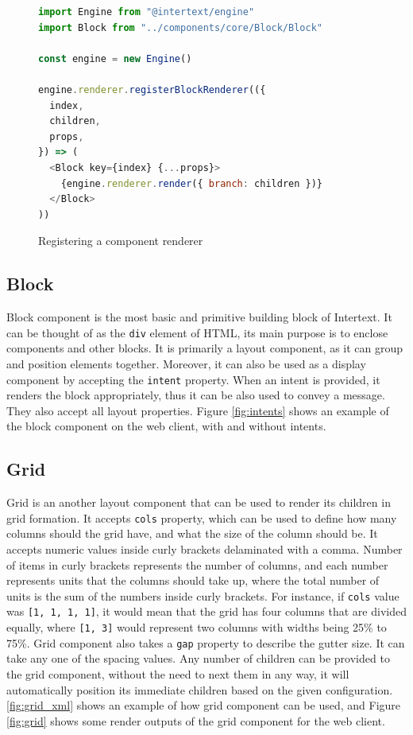 \begin{figure}
\begin{minipage}{\linewidth}
\begin{lstlisting}[language=javascript]
import Engine from "@intertext/engine"
import Block from "../components/core/Block/Block"

const engine = new Engine()

engine.renderer.registerBlockRenderer(({
  index,
  children,
  props,
}) => (
  <Block key={index} {...props}>
    {engine.renderer.render({ branch: children })}
  </Block>
))
\end{lstlisting}
\end{minipage}
\caption{Registering a component renderer}%
\label{fig:registering_renderer}%
\end{figure}

\subsection{Block}

Block component is the most basic and primitive building block of Intertext. It can be thought of as the \texttt{div} element of HTML, its main purpose is to enclose components and other blocks. It is primarily a layout component, as it can group and position elements together. Moreover, it can also be used as a display component by accepting the \texttt{intent} property. When an intent is provided, it renders the block appropriately, thus it can be also used to convey a message. They also accept all layout properties. Figure \ref{fig:intents} shows an example of the block component on the web client, with and without intents.

\subsection{Grid}

Grid is an another layout component that can be used to render its children in grid formation. It accepts \texttt{cols} property, which can be used to define how many columns should the grid have, and what the size of the column should be. It accepts numeric values inside curly brackets delaminated with a comma. Number of items in curly brackets represents the number of columns, and each number represents units that the columns should take up, where the total number of units is the sum of the numbers inside curly brackets. For instance, if \texttt{cols} value was \texttt{[1, 1, 1, 1]}, it would mean that the grid has four columns that are divided equally, where \texttt{[1, 3]} would represent two columns with widths being 25\% to 75\%. Grid component also takes a \texttt{gap} property to describe the gutter size. It can take any one of the spacing values. Any number of children can be provided to the grid component, without the need to next them in any way, it will automatically position its immediate children based on the given configuration. \ref{fig:grid_xml} shows an example of how grid component can be used, and Figure \ref{fig:grid} shows some render outputs of the grid component for the web client.

